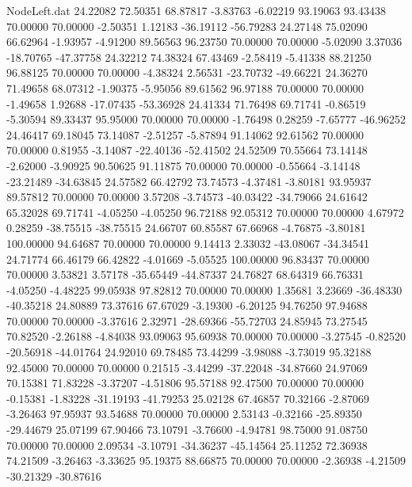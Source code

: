 \begin{filecontents}{NodeLeft.dat}
  24.22082   72.50351   68.87817    -3.83763   -6.02219   93.19063   93.43438   70.00000   70.00000   -2.50351    1.12183  -36.19112  -56.79283
  24.27148   75.02090   66.62964    -1.93957   -4.91200   89.56563   96.23750   70.00000   70.00000   -5.02090    3.37036  -18.70765  -47.37758
  24.32212   74.38324   67.43469    -2.58419   -5.41338   88.21250   96.88125   70.00000   70.00000   -4.38324    2.56531  -23.70732  -49.66221
  24.36270   71.49658   68.07312    -1.90375   -5.95056   89.61562   96.97188   70.00000   70.00000   -1.49658    1.92688  -17.07435  -53.36928
  24.41334   71.76498   69.71741    -0.86519   -5.30594   89.33437   95.95000   70.00000   70.00000   -1.76498    0.28259   -7.65777  -46.96252
  24.46417   69.18045   73.14087    -2.51257   -5.87894   91.14062   92.61562   70.00000   70.00000    0.81955   -3.14087  -22.40136  -52.41502
  24.52509   70.55664   73.14148    -2.62000   -3.90925   90.50625   91.11875   70.00000   70.00000   -0.55664   -3.14148  -23.21489  -34.63845
  24.57582   66.42792   73.74573    -4.37481   -3.80181   93.95937   89.57812   70.00000   70.00000    3.57208   -3.74573  -40.03422  -34.79066
  24.61642   65.32028   69.71741    -4.05250   -4.05250   96.72188   92.05312   70.00000   70.00000    4.67972    0.28259  -38.75515  -38.75515
  24.66707   60.85587   67.66968    -4.76875   -3.80181  100.00000   94.64687   70.00000   70.00000    9.14413    2.33032  -43.08067  -34.34541
  24.71774   66.46179   66.42822    -4.01669   -5.05525  100.00000   96.83437   70.00000   70.00000    3.53821    3.57178  -35.65449  -44.87337
  24.76827   68.64319   66.76331    -4.05250   -4.48225   99.05938   97.82812   70.00000   70.00000    1.35681    3.23669  -36.48330  -40.35218
  24.80889   73.37616   67.67029    -3.19300   -6.20125   94.76250   97.94688   70.00000   70.00000   -3.37616    2.32971  -28.69366  -55.72703
  24.85945   73.27545   70.82520    -2.26188   -4.84038   93.09063   95.60938   70.00000   70.00000   -3.27545   -0.82520  -20.56918  -44.01764
  24.92010   69.78485   73.44299    -3.98088   -3.73019   95.32188   92.45000   70.00000   70.00000    0.21515   -3.44299  -37.22048  -34.87660
  24.97069   70.15381   71.83228    -3.37207   -4.51806   95.57188   92.47500   70.00000   70.00000   -0.15381   -1.83228  -31.19193  -41.79253
  25.02128   67.46857   70.32166    -2.87069   -3.26463   97.95937   93.54688   70.00000   70.00000    2.53143   -0.32166  -25.89350  -29.44679
  25.07199   67.90466   73.10791    -3.76600   -4.94781   98.75000   91.08750   70.00000   70.00000    2.09534   -3.10791  -34.36237  -45.14564
  25.11252   72.36938   74.21509    -3.26463   -3.33625   95.19375   88.66875   70.00000   70.00000   -2.36938   -4.21509  -30.21329  -30.87616

\end{filecontents}
